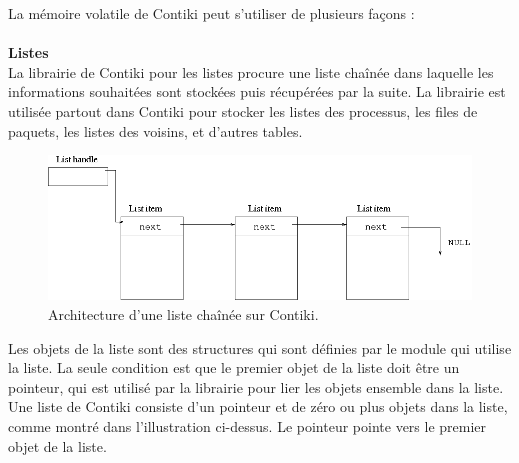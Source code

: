 			La mémoire volatile de Contiki peut s'utiliser de plusieurs façons :\\ \\
			\textbf{Listes}\\
				La librairie de Contiki pour les listes procure une liste chaînée dans laquelle les informations souhaitées sont stockées puis récupérées par la suite. La librairie est utilisée partout dans Contiki pour stocker les listes des processus, les files de paquets, les listes des voisins, et d'autres tables.\\
				\begin{figure}[htp]
					\centering
					\includegraphics[width=16cm]{images/linked-list}
					\caption{Architecture d'une liste chaînée sur Contiki.}
					\label{fig:list}
				\end{figure}
				Les objets de la liste sont des structures qui sont définies par le module qui utilise la liste. La seule condition est que le premier objet de la liste doit être un pointeur, qui est utilisé par la librairie pour lier les objets ensemble dans la liste.\\
				Une liste de Contiki consiste d'un pointeur et de zéro ou plus objets dans la liste, comme montré dans l'illustration ci-dessus. Le pointeur pointe vers le premier objet de la liste.\\
				
